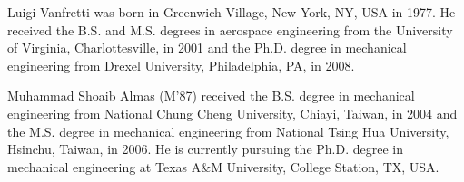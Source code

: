 \documentclass{ieeeaccess}
\begin{document}
\begin{IEEEbiography}{Luigi Vanfretti} was born in Greenwich Village, New York, NY, USA in 
1977. He received the B.S. and M.S. degrees in aerospace engineering from 
the University of Virginia, Charlottesville, in 2001 and the Ph.D. degree in 
mechanical engineering from Drexel University, Philadelphia, PA, in 2008.

\end{IEEEbiography}

\begin{IEEEbiography}{Muhammad Shoaib Almas} (M'87) received the B.S. degree in mechanical 
engineering from National Chung Cheng University, Chiayi, Taiwan, in 2004 
and the M.S. degree in mechanical engineering from National Tsing Hua 
University, Hsinchu, Taiwan, in 2006. He is currently pursuing the Ph.D. 
degree in mechanical engineering at Texas A{\&}M University, College 
Station, TX, USA.

\end{IEEEbiography}

\EOD
\end{document}
